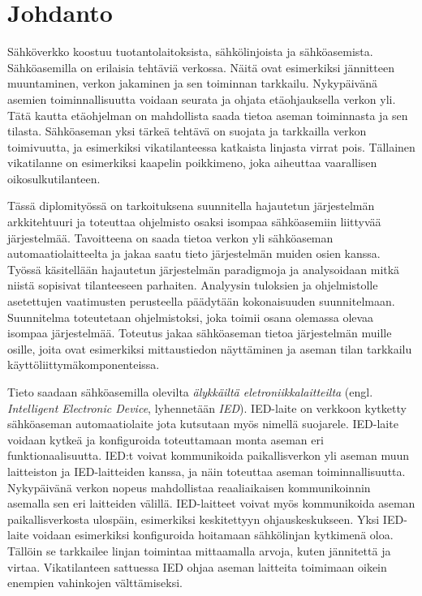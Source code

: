\chapter{Johdanto}
\label{ch:johdanto}
Sähköverkko koostuu tuotantolaitoksista, sähkölinjoista ja sähköasemista. Sähköasemilla on erilaisia tehtäviä verkossa. Näitä ovat esimerkiksi jännitteen muuntaminen, verkon jakaminen ja sen toiminnan tarkkailu. Nykypäivänä asemien toiminnallisuutta voidaan seurata ja ohjata etäohjauksella verkon yli. Tätä kautta etäohjelman on mahdollista saada tietoa aseman toiminnasta ja sen tilasta. Sähköaseman yksi tärkeä tehtävä on suojata ja tarkkailla verkon toimivuutta, ja esimerkiksi vikatilanteessa katkaista linjasta virrat pois. Tällainen vikatilanne on esimerkiksi kaapelin poikkimeno, joka aiheuttaa vaarallisen oikosulkutilanteen.

Tässä diplomityössä on tarkoituksena suunnitella hajautetun järjestelmän arkkitehtuuri ja toteuttaa ohjelmisto osaksi isompaa sähköasemiin liittyvää järjestelmää. Tavoitteena on saada tietoa verkon yli sähköaseman automaatiolaitteelta ja jakaa saatu tieto järjestelmän muiden osien kanssa. Työssä käsitellään hajautetun järjestelmän paradigmoja ja analysoidaan mitkä niistä sopisivat tilanteeseen parhaiten. Analyysin tuloksien ja ohjelmistolle asetettujen vaatimusten perusteella päädytään kokonaisuuden suunnitelmaan. Suunnitelma toteutetaan ohjelmistoksi, joka toimii osana olemassa olevaa isompaa järjestelmää. Toteutus jakaa sähköaseman tietoa järjestelmän muille osille, joita ovat esimerkiksi mittaustiedon näyttäminen ja aseman tilan tarkkailu käyttöliittymäkomponenteissa.

Tieto saadaan sähköasemilla olevilta \emph{älykkäiltä eletroniikkalaitteilta} (engl. \emph{Intelligent Electronic Device}, lyhennetään \emph{IED}). IED-laite on verkkoon kytketty sähköaseman automaatiolaite jota kutsutaan myös nimellä suojarele. IED-laite voidaan kytkeä ja konfiguroida toteuttamaan monta aseman eri funktionaalisuutta. IED:t voivat kommunikoida paikallisverkon yli aseman muun laitteiston ja IED-laitteiden kanssa, ja näin toteuttaa aseman toiminnallisuutta. Nykypäivänä verkon nopeus mahdollistaa reaaliaikaisen kommunikoinnin asemalla sen eri laitteiden välillä. IED-laitteet voivat myös kommunikoida aseman paikallisverkosta ulospäin, esimerkiksi keskitettyyn ohjauskeskukseen. Yksi IED-laite voidaan esimerkiksi konfiguroida hoitamaan sähkölinjan kytkimenä oloa. Tällöin se tarkkailee linjan toimintaa mittaamalla arvoja, kuten jännitettä ja virtaa. Vikatilanteen sattuessa IED ohjaa aseman laitteita toimimaan oikein enempien vahinkojen välttämiseksi. \cite{Brunner2008}

